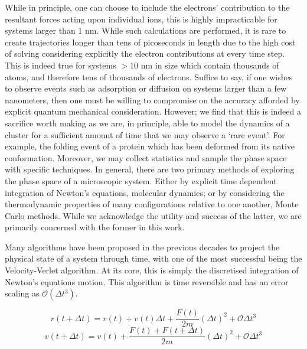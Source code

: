 While in principle, one can choose to include the electrons' contribution to the resultant forces acting upon individual ions, this is highly impracticable for systems larger than 1 nm. While such calculations are performed, it is rare to create trajectories longer than tens of picoseconds in length due to the high cost of solving considering explicitly the electron contributions at every time step. This is indeed true for systems $>$10 nm in size which contain thousands of atoms, and therefore tens of thousands of electrons. Suffice to say, if one wishes to observe events such as adsorption or diffusion on systems larger than a few nanometers, then one must be willing to compromise on the accuracy afforded by explicit quantum mechanical consideration. However; we find that this is indeed a sacrifice worth making as we are, in principle, able to model the dynamics of a cluster for a sufficient amount of time that we may observe a `rare event'. For example, the folding event of a protein which has been deformed from its native conformation. Moreover, we may collect statistics and sample the phase space with specific techniques. In general, there are two primary methods of exploring the phase space of a microscopic system. Either by explicit time dependent integration of Newton's equations, molecular dynamics; or by considering the thermodynamic properties of many configurations relative to one another, Monte Carlo methods. While we acknowledge the utility and success of the latter, we are primarily concerned with the former in this work.

Many algorithms have been proposed in the previous decades to project the physical state of a system through time, with one of the most successful being the Velocity-Verlet algorithm. At its core, this is simply the discretised integration of Newton's equations motion. This algorithm is time reversible and has an error scaling as $\mathcal{O}( \Delta t^{3} )$.

\begin{equation}
    r(t+\Delta t) = r(t) + v(t)\Delta t + \frac{F(t)} {2m}\left( \Delta t \right) ^{2} + \mathcal{O}{\Delta t^{3}}
    \label{eqn:vel-ver-r}
\end{equation}
\begin{equation}
    v(t+\Delta t) = v(t) + \frac{F(t) + F(t+\Delta t)}{2m}\left(\Delta t\right)^{2} + \mathcal{O}{\Delta t^{3}}
    \label{eqn:vel-ver-v}
\end{equation}

